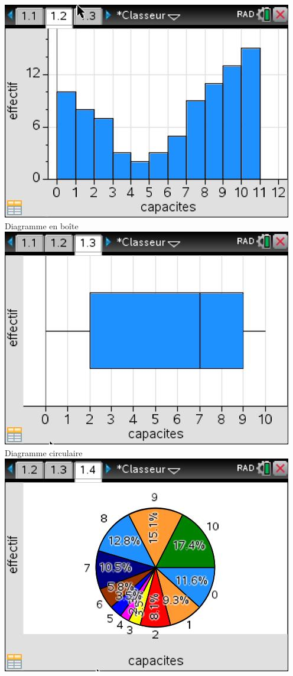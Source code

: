 \begin{enumerate}
\includegraphics[scale=0.5]{chap8_corr_ill1.jpg}\newline
Diagramme en boîte \newline
\includegraphics[scale=0.5]{chap8_corr_ill2.jpg}\newline
Diagramme circulaire\newline
\includegraphics[scale=0.5]{chap8_corr_ill3.jpg}\newline

\end{enumerate}

